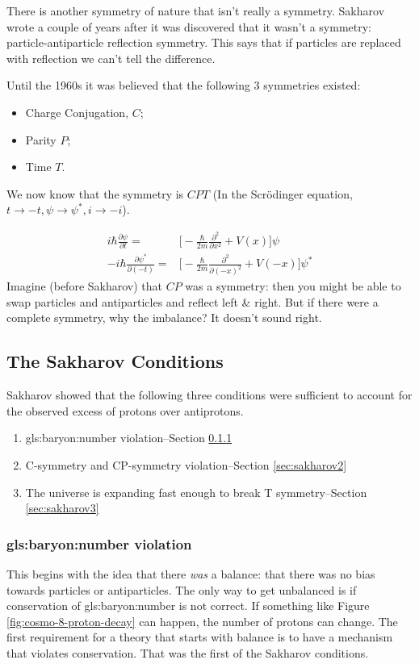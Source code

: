 \documentclass[]{article}
\begin{document}
There is another symmetry of nature that isn't really a symmetry. Sakharov wrote a couple of years after it was discovered that it wasn't a symmetry: particle-antiparticle reflection symmetry. This says that if particles are replaced with reflection we can't tell the difference.

Until the 1960s it was believed that the following 3 symmetries existed:
\begin{itemize}
	\item Charge Conjugation, $C$;
	\item Parity $P$;
	\item Time $T$.
\end{itemize} 

We now know that the symmetry is $CPT$ (In the Scr\"odinger equation, $t\rightarrow-t, \psi\rightarrow\psi^{*}, i\rightarrow -i$).

\begin{align*}
	i \hbar \frac{\partial \psi}{\partial t} =& \big[-\frac{\hbar}{2m} \frac{\partial^2 }{\partial x^2} + V(x)\big]\psi\\
	-i \hbar \frac{\partial \psi^*}{\partial (-t)} =& \big[-\frac{\hbar}{2m} \frac{\partial^2 }{\partial (-x)^2} + V(-x)\big]\psi^*
\end{align*}
Imagine (before Sakharov) that $CP$ was a symmetry: then you might be able to swap particles and antiparticles and reflect left \& right. But if there were a complete symmetry, why the imbalance? It doesn't sound right.

\subsection{The Sakharov Conditions}
Sakharov showed that the following three conditions were sufficient to account for the observed excess of protons over antiprotons.
\begin{enumerate}
	\item \gls{gls:baryon:number} violation--Section \ref{sec:sakharov1}
	\item C-symmetry and CP-symmetry violation--Section \ref{sec:sakharov2}
	\item The universe is expanding fast enough to break T symmetry--Section \ref{sec:sakharov3}
\end{enumerate}

\subsubsection{\gls{gls:baryon:number} violation}\label{sec:sakharov1}
 This begins with the idea that there \emph{was} a balance: that there was no bias towards particles or antiparticles. The only way to get unbalanced is if conservation of \gls{gls:baryon:number} is not correct. If something like Figure \ref{fig:cosmo-8-proton-decay} can happen, the number of protons can change. The first requirement for a theory that starts with balance is to have a mechanism that violates conservation. That was the first of the Sakharov conditions.
\end{document}
